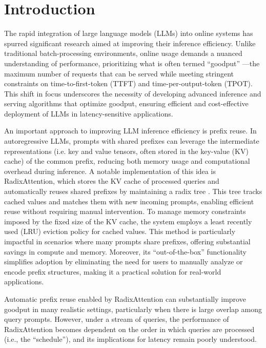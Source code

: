 

\section{Introduction}

The rapid integration of large language models (LLMs) into online systems has spurred significant research aimed at improving their inference efficiency. Unlike traditional batch-processing environments, online usage demands a nuanced understanding of performance, prioritizing what is often termed ``goodput'' \cite{zhong2024distserve}—the maximum number of requests that can be served while meeting stringent constraints on time-to-first-token (TTFT) and time-per-output-token (TPOT). This shift in focus underscores the necessity of developing advanced inference and serving algorithms that optimize goodput, ensuring efficient and cost-effective deployment of LLMs in latency-sensitive applications.

An important approach to improving LLM inference efficiency is prefix reuse. In autoregressive LLMs, prompts with shared prefixes can leverage the intermediate representations (i.e. key and value tensors, often stored in the key-value (KV) cache) of the common prefix, reducing both memory usage and computational overhead during inference. A notable implementation of this idea is RadixAttention, which stores the KV cache of processed queries and automatically reuses shared prefixes by maintaining a radix tree \cite{zheng2024sglang}. This tree tracks cached values and matches them with new incoming prompts, enabling efficient reuse without requiring manual intervention. To manage memory constraints imposed by the fixed size of the KV cache, the system employs a least recently used (LRU) eviction policy for cached values. This method is particularly impactful in scenarios where many prompts share prefixes, offering substantial savings in compute and memory. Moreover, its ``out-of-the-box'' functionality simplifies adoption by eliminating the need for users to manually analyze or encode prefix structures, making it a practical solution for real-world applications.

Automatic prefix reuse enabled by RadixAttention can substantially improve goodput in many realistic settings, particularly when there is large overlap among query prompts. However, under a stream of queries, the performance of RadixAttention becomes dependent on the order in which queries are processed (i.e., the ``schedule''), and its implications for latency remain poorly understood.



